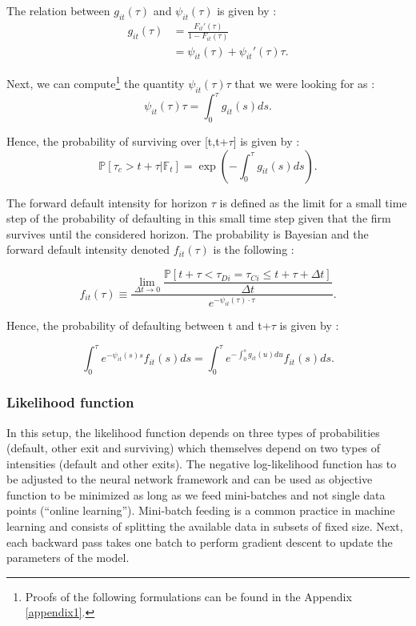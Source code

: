 \noindent The relation between $g_{it}(\tau)$ and $\psi_{it}(\tau)$  is given by :
\begin{align} \label{gphi}
    g_{it}(\tau) &= \frac{F_{it}'(\tau)}{1-F_{it}(\tau)} \nonumber \\
    &= \psi_{it}(\tau) + \psi_{it}'(\tau)\tau.
\end{align}

\noindent Next, we can compute\footnote{Proofs of the following formulations can be found in the Appendix \ref{appendix1}.} the quantity $\psi_{it}(\tau) \tau$ that we were looking for as :
\begin{equation}
    \psi_{it}(\tau) \tau = \int_0^{\tau}g_{it}(s) ds.
\end{equation}

\noindent Hence, the probability of surviving over [t,t+$\tau$] is given by :
\begin{equation} \label{survprob}
    \mathbb{P}[\tau_c > t+\tau |\mathbb{F}_t] = \exp(-\int_0^\tau g_{it}(s) ds).
\end{equation}

The forward default intensity for horizon $\tau$ is defined as the limit for a small time step of the probability of defaulting in this small time step given that the firm survives until the considered horizon. The probability is Bayesian and the forward default intensity denoted $f_{it}(\tau)$ is the following :

\begin{equation}
f_{it}(\tau) \equiv \dfrac{\lim_{\Delta t\to 0} \dfrac{\mathbb{P}[t + \tau < \tau_{Di}=\tau_{Ci} \leq t+ \tau + \Delta t]}{\Delta t}}{e^{-\psi_{it}(\tau)\cdot\tau}}.
\end{equation}

Hence, the probability of defaulting between t and t+$\tau$ is given by :

\begin{equation}\label{probdef}
\int_0^{\tau} e^{-\psi_{it}(s)s} f_{it}(s)ds = \int_0^{\tau} e^{-\int_0^s g_{it}(u) du} f_{it}(s)ds.
\end{equation}


\subsubsection{Likelihood function}
\label{SSS:2-1-2}

In this setup, the likelihood function depends on three types of probabilities (default, other exit and surviving) which themselves depend on two types of intensities (default and other exits). The negative log-likelihood function has to be adjusted to the neural network framework and can be used as objective function to be minimized as long as we feed mini-batches and not single data points (``online learning''). Mini-batch feeding is a common practice in machine learning and consists of splitting the available data in subsets of fixed size. Next, each backward pass takes one batch to perform gradient descent to update the parameters of the model. \\

